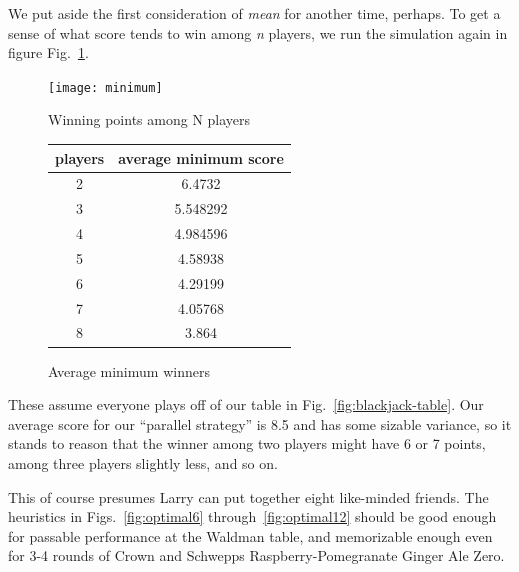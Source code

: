 \documentclass[11pt, oneside]{article} 	%
\begin{document}
We put aside the first consideration of \emph{mean} for another time, perhaps.
To get a sense of what score tends to win among \emph{n} players, we run the simulation again in figure Fig.~\ref{fig:minimum}.

\begin{figure}[!htb]
\centering
\texttt{[image: minimum]}
\caption{Winning points among N players}
\label{fig:minimum}
\end{figure}

\begin{figure}[!htb]
\centering
\begin{tabular}{c | c }
players & average minimum score \\
\hline
2 & 6.4732 \\
3 & 5.548292 \\
4 & 4.984596 \\
5 & 4.58938 \\
6 & 4.29199 \\
7 & 4.05768 \\
8 & 3.864 \\
\end{tabular}
\caption{Average minimum winners}
\label{fig:min-winners}
\end{figure}

These assume everyone plays off of our table in Fig.~\ref{fig:blackjack-table}.  Our average score for our ``parallel strategy''  is 8.5 and has some sizable variance, so it stands to reason that the winner among two players might have 6 or 7 points, among three players slightly less, and so on.  

This of course presumes Larry can put together eight like-minded friends. The heuristics in Figs.~\ref{fig:optimal6} through~\ref{fig:optimal12} should be good enough for passable performance at the Waldman table, and memorizable enough even for 3-4 rounds of Crown and Schwepps Raspberry-Pomegranate Ginger Ale Zero.
\end{document}
